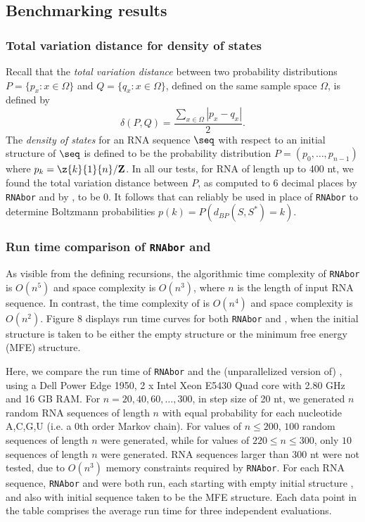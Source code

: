 \subsection*{Benchmarking results}

\subsubsection*{Total variation distance for density of states}

Recall that the {\em total variation distance}
between two probability distributions
$P = \{ p_{x} : x \in \Omega\}$ and
$Q = \{ q_{x} : x \in \Omega\}$, defined on the same sample space $\Omega$, is
defined by
\[
\delta(P,Q) = \frac{\sum_{x \in \Omega} |p_x - q_x|}{2}.
\]
The {\em density of states} for an RNA sequence $\seq$ with respect to
an initial structure \strSt of $\seq$ is defined to be the probability
distribution
$P = (p_0,\ldots,p_{n-1})$ where $p_k = \z{k}{1}{n}/{\bf Z}$.
In all our tests, for RNA of length up to 400 nt, we found the total
variation distance between $P$, as computed to 6 decimal places by
{\tt RNAbor} and by \fftbor, to be $0$. It follows that \fftbor
can reliably be used in place of {\tt RNAbor} to determine Boltzmann
probabilities $p(k) = P\left( d_{BP}(S,S^*)=k \right)$.

\subsubsection*{Run time comparison of {\tt RNAbor} and \fftbor}

As visible from the defining recursions, the algorithmic time complexity of
{\tt RNAbor} is $O(n^5)$ and space complexity is $O(n^3)$, where $n$ is
the length of input RNA sequence. In contrast, the time complexity of
\fftbor is $O(n^4)$ and space complexity is $O(n^2)$.
Figure 8 displays run time curves for both
{\tt RNAbor} and \fftbor, when the initial structure \strSt is
taken to be either the empty structure or the minimum free energy
(MFE) structure.

Here, we compare the run time of {\tt RNAbor} \cite{Freyhult.b07} and
the (unparallelized version of) \fftbor, using
a Dell Power Edge 1950, 2 x Intel Xeon E5430 Quad
core with 2.80 GHz and 16 GB RAM. For $n = 20,40,60,\ldots, 300$, in step
size of 20 nt, we generated $n$ random RNA sequences of length $n$ with equal
probability for each nucleotide A,C,G,U (i.e. a $0$th order Markov chain).
For values of $n \leq 200$, $100$ random sequences of length
$n$ were generated, while for values of $220 \leq n \leq 300$, only
$10$ sequences of length $n$ were generated.
RNA sequences larger than 300 nt were not tested,
due to $O(n^3)$ memory constraints required by {\tt RNAbor}.
For each RNA sequence, {\tt RNAbor} and \fftbor were both run,
each starting with empty initial structure \strSt, and also
with initial sequence \strSt taken to be the MFE structure.
Each data point in the table comprises the average run time for three
independent evaluations.

